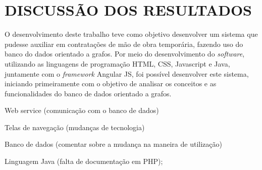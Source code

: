 
\chapter{DISCUSSÃO DOS RESULTADOS} 

\par O desenvolvimento deste trabalho teve como objetivo desenvolver um sistema que pudesse auxiliar em contratações de mão de obra temporária, fazendo uso do banco do dados orientado a grafos. Por meio do desenvolvimento do \textit{software}, utilizando as linguagens de programação HTML, CSS, Javascript e Java, juntamente com o \textit{framework} Angular JS, foi possível desenvolver este sistema, iniciando primeiramente com o objetivo de analisar os conceitos e as funcionalidades do banco de dados orientado a grafos.

\par Web service (comunicação com o banco de dados)
\par Telas de navegação (mudanças de tecnologia)
\par Banco de dados (comentar sobre a mudança na maneira de utilização)
\par Linguagem Java (falta de documentação em PHP);

